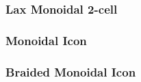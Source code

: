 %

%


\subsubsection*{Lax Monoidal 2-cell}

  \newpage

 \newpage

 \newpage





%
%

\newpage
\subsubsection*{Monoidal Icon}

\newpage

\newpage

\newpage

\subsubsection*{Braided Monoidal Icon}


